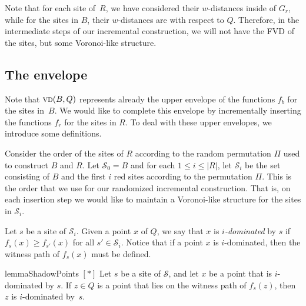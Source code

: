 \documentclass[a4paper,UKenglish]{socg-lipics-v2018}
\newcommand{\idom}[1][i]{${#1}$-dominated\xspace}
\newcommand{\s}{\mathcal S}
\newcommand{\vd}[2][P]{\textsc{vd}(#2, #1)}
\begin{document}

Note that for each site of~$R$, we have considered their $w$-distances inside of $G_r$, while for the sites in $B$, their $w$-distances are with respect to $Q$.
Therefore, in the intermediate steps of our incremental construction, we will not have the FVD of the sites, but some Voronoi-like structure.



\subsection{The envelope}
Note that $\vd[Q]{B}$ represents already the upper envelope of the functions $f_b$ for the sites in~$B$. 
We would like to complete this envelope by incrementally inserting the functions $f_r$ for the sites in $R$.
To deal with these upper envelopes, we introduce some definitions.




Consider the order of the sites of $R$ according to the random permutation $\Pi$ used to construct $B$ and $R$.
Let $\s_0 = B$ and for each $1\leq i\leq |R|$, let $\s_i$ be the set consisting of $B$ and the first $i$ red sites according to the permutation $\Pi$.
This is the order that we use for our randomized incremental construction. 
That is, on each insertion step we would like to maintain a Voronoi-like structure for the sites in $\s_i$.

Let $s$ be a site of $\s_i$.
Given a point $x$ of $Q$, we say that $x$ is \emph{\idom} by $s$ if $f_s(x) \geq f_{s'}(x)$ for all $s'\in \s_i$.
Notice that if a point $x$ is \idom, then the witness path of $f_s(x)$ must be defined. 


\begin{restatable}{lemma}{ShadowPoints}\label{lemma:Shadow points}
$[*]$ 
Let $s$ be a site of $\s$, and let $x$ be a point that is \idom by $s$. If $z\in Q$ is a point that lies on the witness path of $f_s(z)$,
then $z$ is \idom by~$s$. 
\end{restatable}
\end{document}
